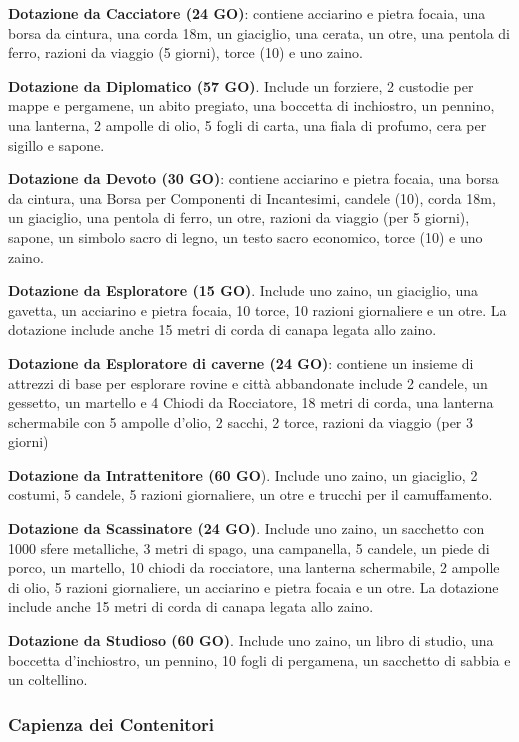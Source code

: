 \documentclass[12pt,a4paper,twoside,openany]{book}
\begin{document}
\begin{multicols}{2}
\textbf{Dotazione da Cacciatore (24 GO)}: contiene acciarino e pietra focaia, una borsa da cintura, una corda 18m, un giaciglio, una cerata, un otre, una pentola di ferro, razioni da viaggio (5 giorni), torce (10) e uno zaino.

\textbf{Dotazione da Diplomatico (57 GO)}. Include un forziere, 2 custodie per mappe e pergamene, un abito pregiato, una boccetta di inchiostro, un pennino, una lanterna, 2 ampolle di olio, 5 fogli di carta, una fiala di profumo, cera per sigillo e sapone.

\textbf{Dotazione da Devoto (30 GO)}: contiene acciarino e pietra focaia, una borsa da cintura, una Borsa per Componenti di Incantesimi, candele (10), corda 18m, un giaciglio, una pentola di ferro, un otre, razioni da viaggio (per 5 giorni), sapone, un simbolo sacro di legno, un testo sacro economico, torce (10) e uno zaino.

\textbf{Dotazione da Esploratore (15 GO)}. Include uno zaino, un giaciglio, una gavetta, un acciarino e pietra focaia, 10 torce, 10 razioni giornaliere e un otre. La dotazione include anche 15 metri di corda di canapa legata allo zaino.

\textbf{Dotazione da Esploratore di caverne (24 GO)}: contiene un insieme di attrezzi di base per esplorare rovine e città abbandonate include 2 candele, un gessetto, un martello e 4 Chiodi da Rocciatore, 18 metri di corda, una lanterna schermabile con 5 ampolle d'olio, 2 sacchi, 2 torce, razioni da viaggio (per 3 giorni)

\textbf{Dotazione da Intrattenitore (60 GO}). Include uno zaino, un giaciglio, 2 costumi, 5 candele, 5 razioni giornaliere, un otre e trucchi per il camuffamento.

\textbf{Dotazione da Scassinatore (24 GO)}. Include uno zaino, un sacchetto con 1000 sfere metalliche, 3 metri di spago, una campanella, 5 candele, un piede di porco, un martello, 10 chiodi da rocciatore, una lanterna schermabile, 2 ampolle di olio, 5 razioni giornaliere, un acciarino e pietra focaia e un otre. La dotazione include anche 15 metri di corda di canapa legata allo zaino.

\textbf{Dotazione da Studioso (60 GO)}. Include uno zaino, un libro di studio, una boccetta d'inchiostro, un pennino, 10 fogli di pergamena, un sacchetto di sabbia e un coltellino.


\end{multicols}

\subsubsection{Capienza dei Contenitori}
\end{document}
